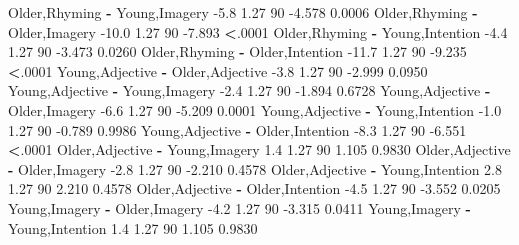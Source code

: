 \documentclass[]{article}
\newenvironment{Shaded}{\begin{snugshade}}{\end{snugshade}}
\newcommand{\DecValTok}[1]{\textcolor[rgb]{0.00,0.00,0.81}{#1}}
\newcommand{\FloatTok}[1]{\textcolor[rgb]{0.00,0.00,0.81}{#1}}
\newcommand{\NormalTok}[1]{#1}
\newcommand{\OperatorTok}[1]{\textcolor[rgb]{0.81,0.36,0.00}{\textbf{#1}}}
\newcommand{\StringTok}[1]{\textcolor[rgb]{0.31,0.60,0.02}{#1}}
\begin{document}
\begin{Shaded}
\begin{Highlighting}[]
\NormalTok{ Older,Rhyming }\OperatorTok{-}\StringTok{ }\NormalTok{Young,Imagery         }\FloatTok{-5.8} \FloatTok{1.27} \DecValTok{90}  \FloatTok{-4.578} \FloatTok{0.0006} 
\NormalTok{ Older,Rhyming }\OperatorTok{-}\StringTok{ }\NormalTok{Older,Imagery        }\FloatTok{-10.0} \FloatTok{1.27} \DecValTok{90}  \FloatTok{-7.893} \OperatorTok{<}\NormalTok{.}\DecValTok{0001} 
\NormalTok{ Older,Rhyming }\OperatorTok{-}\StringTok{ }\NormalTok{Young,Intention       }\FloatTok{-4.4} \FloatTok{1.27} \DecValTok{90}  \FloatTok{-3.473} \FloatTok{0.0260} 
\NormalTok{ Older,Rhyming }\OperatorTok{-}\StringTok{ }\NormalTok{Older,Intention      }\FloatTok{-11.7} \FloatTok{1.27} \DecValTok{90}  \FloatTok{-9.235} \OperatorTok{<}\NormalTok{.}\DecValTok{0001} 
\NormalTok{ Young,Adjective }\OperatorTok{-}\StringTok{ }\NormalTok{Older,Adjective     }\FloatTok{-3.8} \FloatTok{1.27} \DecValTok{90}  \FloatTok{-2.999} \FloatTok{0.0950} 
\NormalTok{ Young,Adjective }\OperatorTok{-}\StringTok{ }\NormalTok{Young,Imagery       }\FloatTok{-2.4} \FloatTok{1.27} \DecValTok{90}  \FloatTok{-1.894} \FloatTok{0.6728} 
\NormalTok{ Young,Adjective }\OperatorTok{-}\StringTok{ }\NormalTok{Older,Imagery       }\FloatTok{-6.6} \FloatTok{1.27} \DecValTok{90}  \FloatTok{-5.209} \FloatTok{0.0001} 
\NormalTok{ Young,Adjective }\OperatorTok{-}\StringTok{ }\NormalTok{Young,Intention     }\FloatTok{-1.0} \FloatTok{1.27} \DecValTok{90}  \FloatTok{-0.789} \FloatTok{0.9986} 
\NormalTok{ Young,Adjective }\OperatorTok{-}\StringTok{ }\NormalTok{Older,Intention     }\FloatTok{-8.3} \FloatTok{1.27} \DecValTok{90}  \FloatTok{-6.551} \OperatorTok{<}\NormalTok{.}\DecValTok{0001} 
\NormalTok{ Older,Adjective }\OperatorTok{-}\StringTok{ }\NormalTok{Young,Imagery        }\FloatTok{1.4} \FloatTok{1.27} \DecValTok{90}   \FloatTok{1.105} \FloatTok{0.9830} 
\NormalTok{ Older,Adjective }\OperatorTok{-}\StringTok{ }\NormalTok{Older,Imagery       }\FloatTok{-2.8} \FloatTok{1.27} \DecValTok{90}  \FloatTok{-2.210} \FloatTok{0.4578} 
\NormalTok{ Older,Adjective }\OperatorTok{-}\StringTok{ }\NormalTok{Young,Intention      }\FloatTok{2.8} \FloatTok{1.27} \DecValTok{90}   \FloatTok{2.210} \FloatTok{0.4578} 
\NormalTok{ Older,Adjective }\OperatorTok{-}\StringTok{ }\NormalTok{Older,Intention     }\FloatTok{-4.5} \FloatTok{1.27} \DecValTok{90}  \FloatTok{-3.552} \FloatTok{0.0205} 
\NormalTok{ Young,Imagery }\OperatorTok{-}\StringTok{ }\NormalTok{Older,Imagery         }\FloatTok{-4.2} \FloatTok{1.27} \DecValTok{90}  \FloatTok{-3.315} \FloatTok{0.0411} 
\NormalTok{ Young,Imagery }\OperatorTok{-}\StringTok{ }\NormalTok{Young,Intention        }\FloatTok{1.4} \FloatTok{1.27} \DecValTok{90}   \FloatTok{1.105} \FloatTok{0.9830} 

\end{Highlighting}
\end{Shaded}
\end{document}
